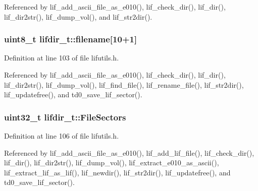 Referenced by lif\+\_\+add\+\_\+ascii\+\_\+file\+\_\+as\+\_\+e010(), lif\+\_\+check\+\_\+dir(), lif\+\_\+dir(), lif\+\_\+dir2str(), lif\+\_\+dump\+\_\+vol(), and lif\+\_\+str2dir().

\subsubsection[{\texorpdfstring{filename}{filename}}]{\setlength{\rightskip}{0pt plus 5cm}uint8\+\_\+t lifdir\+\_\+t\+::filename\mbox{[}10+1\mbox{]}}\hypertarget{structlifdir__t_a700fd2eb77539353ba670b76d9acb29d}{}\label{structlifdir__t_a700fd2eb77539353ba670b76d9acb29d}


Definition at line 103 of file lifutils.\+h.



Referenced by lif\+\_\+add\+\_\+ascii\+\_\+file\+\_\+as\+\_\+e010(), lif\+\_\+check\+\_\+dir(), lif\+\_\+dir(), lif\+\_\+dir2str(), lif\+\_\+dump\+\_\+vol(), lif\+\_\+find\+\_\+file(), lif\+\_\+rename\+\_\+file(), lif\+\_\+str2dir(), lif\+\_\+updatefree(), and td0\+\_\+save\+\_\+lif\+\_\+sector().

\subsubsection[{\texorpdfstring{File\+Sectors}{FileSectors}}]{\setlength{\rightskip}{0pt plus 5cm}uint32\+\_\+t lifdir\+\_\+t\+::\+File\+Sectors}\hypertarget{structlifdir__t_a92382e062294ebdc632c6c78dcd397aa}{}\label{structlifdir__t_a92382e062294ebdc632c6c78dcd397aa}


Definition at line 106 of file lifutils.\+h.



Referenced by lif\+\_\+add\+\_\+ascii\+\_\+file\+\_\+as\+\_\+e010(), lif\+\_\+add\+\_\+lif\+\_\+file(), lif\+\_\+check\+\_\+dir(), lif\+\_\+dir(), lif\+\_\+dir2str(), lif\+\_\+dump\+\_\+vol(), lif\+\_\+extract\+\_\+e010\+\_\+as\+\_\+ascii(), lif\+\_\+extract\+\_\+lif\+\_\+as\+\_\+lif(), lif\+\_\+newdir(), lif\+\_\+str2dir(), lif\+\_\+updatefree(), and td0\+\_\+save\+\_\+lif\+\_\+sector().

